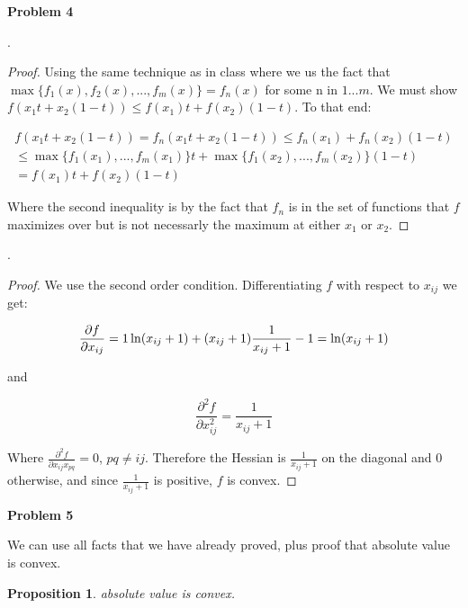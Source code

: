 \documentclass{article}
\newtheorem{prop}{Proposition}
\begin{document}
\vspace{5mm}
\newpage
\noindent\textbf{Problem 4}

\vspace{3mm}

.
\begin{proof}Using the same technique as in class where we us the fact that $\max\{f_1(x),f_2(x),...,f_m(x)\} = f_n(x)$ for some n in $1...m$. We must show $f(x_1t + x_2(1-t)) \leq f(x_1)t + f(x_2)(1-t)$. To that end:

\begin{gather*}
  f(x_1t + x_2(1-t)) = f_n(x_1t + x_2(1-t)) \leq f_n(x_1) + f_n(x_2)(1-t)\\
  \leq \max\{f_1(x_1),...,f_m(x_1)\} t + \max\{f_1(x_2),...,f_m(x_2)\}(1-t) \\
  = f(x_1)t + f(x_2)(1-t)
\end{gather*}

\noindent Where the second inequality is by the fact that $f_n$ is in the set of functions that $f$ maximizes over but is not necessarly the maximum at either $x_1$ or $x_2$.
\end{proof}



.

\begin{proof}
  
  We use the second order condition. Differentiating $f$ with respect to $x_{ij}$ we get:


  $$\frac{\partial f}{\partial x_{ij}} = 1\ln(x_{ij} + 1) + (x_{ij} + 1)\frac{1}{x_{ij}+1} - 1 = \ln(x_{ij}+1)\\$$

  and

  $$\frac{\partial^2 f}{\partial x_{ij}^2} = \frac{1}{x_{ij}+1}$$

\noindent Where $\frac{\partial^2 f}{\partial x_{ij}x_{pq}} = 0$, $pq \neq ij$. Therefore the Hessian is $\frac{1}{x_{ij}+1}$ on the diagonal and $0$ otherwise, and since  $\frac{1}{x_{ij}+1}$ is positive, $f$ is convex. 

  \end{proof}

\vspace{5mm}

\noindent\textbf{Problem 5}

\noindent We can use all facts that we have already proved, plus proof that absolute value is convex.

\begin{prop}
  absolute value is convex.
\end{prop}
\end{document}
